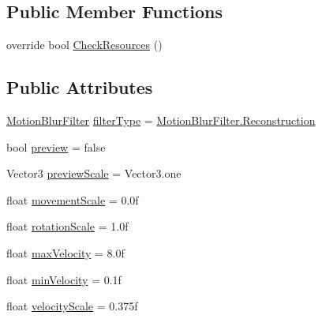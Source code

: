 \subsection*{Public Member Functions}
\begin{DoxyCompactItemize}
\item 
override bool \mbox{\hyperlink{class_unity_standard_assets_1_1_image_effects_1_1_camera_motion_blur_a4d123b09d7f7ce64ff061fe228d01fca}{Check\+Resources}} ()
\end{DoxyCompactItemize}
\subsection*{Public Attributes}
\begin{DoxyCompactItemize}
\item 
\mbox{\hyperlink{class_unity_standard_assets_1_1_image_effects_1_1_camera_motion_blur_a5243e3d1f6a29d119409056d2e2ba99f}{Motion\+Blur\+Filter}} \mbox{\hyperlink{class_unity_standard_assets_1_1_image_effects_1_1_camera_motion_blur_a4095304016808a9b9370e6c41bba8a8c}{filter\+Type}} = \mbox{\hyperlink{class_unity_standard_assets_1_1_image_effects_1_1_camera_motion_blur_a5243e3d1f6a29d119409056d2e2ba99fa2d4907781ee5dad928d4c2f39d4d4848}{Motion\+Blur\+Filter.\+Reconstruction}}
\item 
bool \mbox{\hyperlink{class_unity_standard_assets_1_1_image_effects_1_1_camera_motion_blur_aa66a7358f181c0bdcbf9ed8ff4a2e394}{preview}} = false
\item 
Vector3 \mbox{\hyperlink{class_unity_standard_assets_1_1_image_effects_1_1_camera_motion_blur_acbfb02a03910f99d28ffc86e04243631}{preview\+Scale}} = Vector3.\+one
\item 
float \mbox{\hyperlink{class_unity_standard_assets_1_1_image_effects_1_1_camera_motion_blur_a6d2abe2f75c13d9dae5b5b9dc9fc74ea}{movement\+Scale}} = 0.\+0f
\item 
float \mbox{\hyperlink{class_unity_standard_assets_1_1_image_effects_1_1_camera_motion_blur_a3d08bc6c65aad2fe3e48abcb2bc23029}{rotation\+Scale}} = 1.\+0f
\item 
float \mbox{\hyperlink{class_unity_standard_assets_1_1_image_effects_1_1_camera_motion_blur_a7995452c9a8ab59e2d6f1767381fe567}{max\+Velocity}} = 8.\+0f
\item 
float \mbox{\hyperlink{class_unity_standard_assets_1_1_image_effects_1_1_camera_motion_blur_ae6e4436e252dda38e280d2ea557a9582}{min\+Velocity}} = 0.\+1f
\item 
float \mbox{\hyperlink{class_unity_standard_assets_1_1_image_effects_1_1_camera_motion_blur_a3345ffe10e8c75ba91387badf041f343}{velocity\+Scale}} = 0.\+375f

\end{DoxyCompactItemize}
